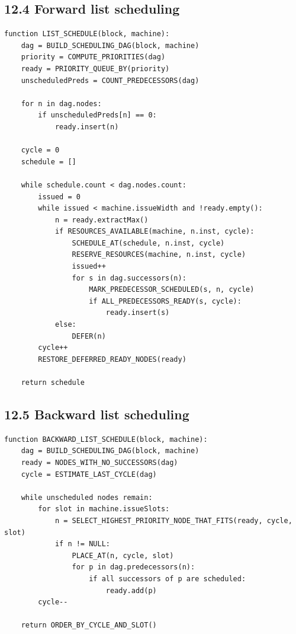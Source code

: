 \documentclass[10pt,letterpaper]{article}
\begin{document}
\subsection*{12.4 Forward list scheduling}
{}

\begin{verbatim}
function LIST_SCHEDULE(block, machine):
    dag = BUILD_SCHEDULING_DAG(block, machine)
    priority = COMPUTE_PRIORITIES(dag)
    ready = PRIORITY_QUEUE_BY(priority)
    unscheduledPreds = COUNT_PREDECESSORS(dag)

    for n in dag.nodes:
        if unscheduledPreds[n] == 0:
            ready.insert(n)

    cycle = 0
    schedule = []

    while schedule.count < dag.nodes.count:
        issued = 0
        while issued < machine.issueWidth and !ready.empty():
            n = ready.extractMax()
            if RESOURCES_AVAILABLE(machine, n.inst, cycle):
                SCHEDULE_AT(schedule, n.inst, cycle)
                RESERVE_RESOURCES(machine, n.inst, cycle)
                issued++
                for s in dag.successors(n):
                    MARK_PREDECESSOR_SCHEDULED(s, n, cycle)
                    if ALL_PREDECESSORS_READY(s, cycle):
                        ready.insert(s)
            else:
                DEFER(n)
        cycle++
        RESTORE_DEFERRED_READY_NODES(ready)

    return schedule
\end{verbatim}

\subsection*{12.5 Backward list scheduling}
{}

\begin{verbatim}
function BACKWARD_LIST_SCHEDULE(block, machine):
    dag = BUILD_SCHEDULING_DAG(block, machine)
    ready = NODES_WITH_NO_SUCCESSORS(dag)
    cycle = ESTIMATE_LAST_CYCLE(dag)

    while unscheduled nodes remain:
        for slot in machine.issueSlots:
            n = SELECT_HIGHEST_PRIORITY_NODE_THAT_FITS(ready, cycle, slot)
            if n != NULL:
                PLACE_AT(n, cycle, slot)
                for p in dag.predecessors(n):
                    if all successors of p are scheduled:
                        ready.add(p)
        cycle--

    return ORDER_BY_CYCLE_AND_SLOT()
\end{verbatim}
\end{document}

